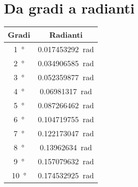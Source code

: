 \section{Da gradi a radianti}
\begin{center}
	\begin{tabular}{cc}
	\toprule
	Gradi & Radianti \\
	\midrule
\SI{1}{\degree}&\SI[round-precision=\extralungarrotandamento,round-mode=places]{0.017453292}{\radian}  \\ 
\SI{2}{\degree}&\SI[round-precision=\extralungarrotandamento,round-mode=places]{0.034906585}{\radian}  \\ 
\SI{3}{\degree}&\SI[round-precision=\extralungarrotandamento,round-mode=places]{0.052359877}{\radian}  \\ 
\SI{4}{\degree}&\SI[round-precision=\extralungarrotandamento,round-mode=places]{0.06981317}{\radian}  \\ 
\SI{5}{\degree}&\SI[round-precision=\extralungarrotandamento,round-mode=places]{0.087266462}{\radian}  \\ 
\SI{6}{\degree}&\SI[round-precision=\extralungarrotandamento,round-mode=places]{0.104719755}{\radian}  \\ 
\SI{7}{\degree}&\SI[round-precision=\extralungarrotandamento,round-mode=places]{0.122173047}{\radian}  \\ 
\SI{8}{\degree}&\SI[round-precision=\extralungarrotandamento,round-mode=places]{0.13962634}{\radian}  \\ 
\SI{9}{\degree}&\SI[round-precision=\extralungarrotandamento,round-mode=places]{0.157079632}{\radian}  \\ 
\SI{10}{\degree}&\SI[round-precision=\extralungarrotandamento,round-mode=places]{0.174532925}{\radian}  \\ 
\bottomrule
\end{tabular} 
\end{center}
